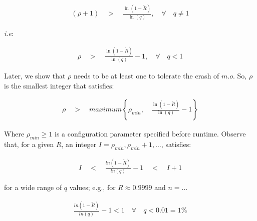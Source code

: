 \begin{description}
        \begin{equation}
            \begin{aligned}
                \left(\rho + 1\right) \quad > \quad \frac{\ln\left( 1 - \tilde{R} \right)}{\ln\left(q \right)}, \quad \forall \quad q \neq 1
            \end{aligned}
        \end{equation}

        \emph{i.e}:        
        
        \begin{equation} \label{eq:rho_ie}
            \begin{aligned}
                \rho \quad > \quad \frac{\ln\left(1 - \tilde{R}\right)}{\ln(q)} - 1, \quad \forall \quad q < 1
            \end{aligned}
        \end{equation}
        
        Later, we show that $\rho$ needs to be at least one to tolerate the crash of $m.o$.  So, $\rho$ is the smallest integer that satisfies:
        
        \begin{equation}
            \begin{aligned}
                \rho \quad > \quad maximum \left\{ \rho_{min}, \quad \frac{\ln\left(1 - \tilde{R}\right)}{\ln(q)} - 1 \right\}
            \end{aligned}
        \end{equation}
        
        Where $\rho_{min} \geq 1$ is a configuration parameter specified before runtime.  Observe that, for a given $R$, an integer $I =\rho_{min}, \rho_{min} + 1, \ldots$, satisfies: 

        \begin{equation}
            \begin{aligned}
                I \quad < \quad  \frac{ln \left(1 - \tilde{R}\right)}{ln(q)} - 1 \quad < \quad I + 1
            \end{aligned}
        \end{equation}
        
        for a wide range of $q$ values; e.g., for $R \approx 0.9999$ and $n = \ldots$

        \begin{equation}
            \begin{aligned}
                \frac{ln(1- \tilde{R})}{ln(q)}-1 < 1 \quad \forall \quad q < 0.01 = 1\%
            \end{aligned}
        \end{equation}


\end{description}
